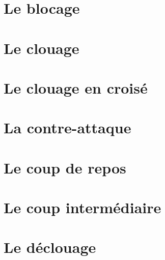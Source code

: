 \documentclass[a5paper,openany,twocolumn]{book}
\begin{document}
{\chapter{Le blocage}

\lipsum[4]

\chapter{Le clouage}

\lipsum[4]

\chapter{Le clouage en croisé}

\lipsum[4]

\chapter{La contre-attaque}

\lipsum[4]

\chapter{Le coup de repos}

\lipsum[4]

\chapter{Le coup intermédiaire}

\lipsum[4]

\chapter{Le déclouage}

}
\end{document}
